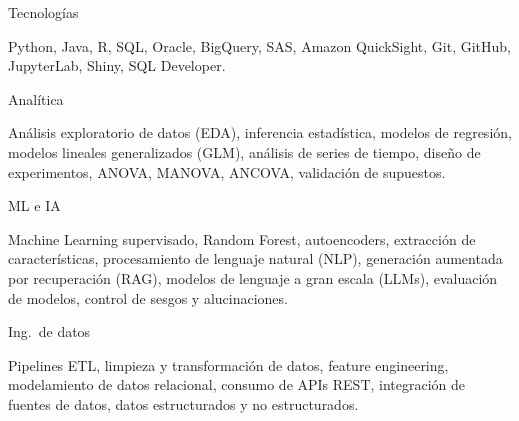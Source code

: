 
\raggedright

\begin{cvskills}

  \cvskill
    {\begin{minipage}[t]{0.28\linewidth}\raggedright Tecnologías\end{minipage}}
    {\parbox[t]{0.72\linewidth}{
    Python, Java, R, SQL, Oracle, BigQuery, SAS, Amazon QuickSight, Git, GitHub, JupyterLab, Shiny, SQL Developer.
    }}

  \cvskill
    {\begin{minipage}[t]{0.28\linewidth}\raggedright Analítica\end{minipage}}
    {\parbox[t]{0.72\linewidth}{
    Análisis exploratorio de datos (EDA), inferencia estadística, modelos de regresión,
    modelos lineales generalizados (GLM), análisis de series de tiempo, diseño de experimentos,
    ANOVA, MANOVA, ANCOVA, validación de supuestos.
    }}

  \cvskill
    {\begin{minipage}[t]{0.28\linewidth}\raggedright ML e IA\end{minipage}}
    {\parbox[t]{0.72\linewidth}{
    Machine Learning supervisado, Random Forest, autoencoders, extracción de características,
    procesamiento de lenguaje natural (NLP), generación aumentada por recuperación (RAG),
    modelos de lenguaje a gran escala (LLMs), evaluación de modelos, control de sesgos y alucinaciones.
    }}

  \cvskill
    {\begin{minipage}[t]{0.28\linewidth}\raggedright Ing.\ de datos\end{minipage}}
    {\parbox[t]{0.72\linewidth}{
    Pipelines ETL, limpieza y transformación de datos, feature engineering,
    modelamiento de datos relacional, consumo de APIs REST, integración de fuentes de datos,
    datos estructurados y no estructurados.
    }}

\end{cvskills}
